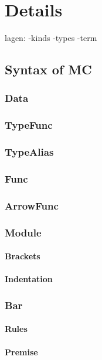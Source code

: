 \chapter{Details}

lagen:
-kinds
-types
-term

\section{Syntax of MC}

\subsection{Data}
\subsection{TypeFunc}
\subsection{TypeAlias}
\subsection{Func}
\subsection{ArrowFunc}

\subsection{Module}
\subsubsection{Brackets}
\subsubsection{Indentation}

\subsection{Bar}
\subsubsection{Rules}
\subsubsection{Premise}
